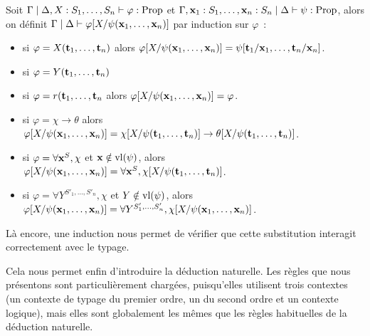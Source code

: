\documentclass{article}
\begin{document}
\begin{defi}
    Soit $\Gamma\mid \Delta, X : S_1,\ldots,S_n\vdash \varphi : \mathrm{Prop}$ et $\Gamma, \mathbf{x}_1 : S_1,\ldots, \mathbf{x}_n : S_n\mid\Delta\vdash \psi : \mathrm{Prop}$, alors on définit $\Gamma\mid\Delta\vdash\varphi[X/\psi(\mathbf{x}_1,\ldots,\mathbf{x}_n)]$ par induction sur $\varphi$~:
    \begin{itemize}
        \item si $\varphi = X(\mathbf{t}_1,\ldots,\mathbf{t}_n)$ alors $\varphi[X/\psi(\mathbf{x}_1,\ldots,\mathbf{x}_n)] = \psi[\mathbf{t}_1/\mathbf{x}_1,\ldots,\mathbf{t}_n/\mathbf{x}_n]$.
        \item si $\varphi = Y(\mathbf{t}_1,\ldots,\mathbf{t}_n)$
        \item si $\varphi = r(\mathbf{t}_1,\ldots,\mathbf{t}_n$ alors $\varphi[X/\psi(\mathbf{x}_1,\ldots,\mathbf{x}_n)] = \varphi$.
        \item si $\varphi = \chi \to \theta$ alors $\varphi[X/\psi(\mathbf{x}_1,\ldots,\mathbf{x}_n)] = \chi[X/\psi(\mathbf{t}_1,\ldots,\mathbf{t}_n)] \to \theta[X/\psi(\mathbf{t}_1,\ldots,\mathbf{t}_n)]$.
        \item si $\varphi = \forall \mathbf{x}^S, \chi$ et $\mathbf{x} \notin \mathrm{vl}(\psi)$, alors $\varphi[X/\psi(\mathbf{x}_1,\ldots,\mathbf{x}_n)] = \forall \mathbf{x}^S, \chi[X/\psi(\mathbf{t}_1,\ldots,\mathbf{t}_n)]$.
        \item si $\varphi = \forall Y^{S'_1,\ldots,S'_n}, \chi$ et $Y\notin\mathrm{vl}(\psi)$, alors $\varphi[X/\psi(\mathbf{x}_1,\ldots,\mathbf{x}_n)] = \forall Y^{S'_1,\ldots,S'_n}, \chi[X/\psi(\mathbf{x}_1,\ldots,\mathbf{x}_n)]$.
    \end{itemize}
\end{defi}

Là encore, une induction nous permet de vérifier que cette substitution interagit correctement avec le typage.

Cela nous permet enfin d'introduire la déduction naturelle. Les règles que nous présentons sont particulièrement chargées, puisqu'elles utilisent trois contextes (un contexte de typage du premier ordre, un du second ordre et un contexte logique), mais elles sont globalement les mêmes que les règles habituelles de la déduction naturelle.
\end{document}

